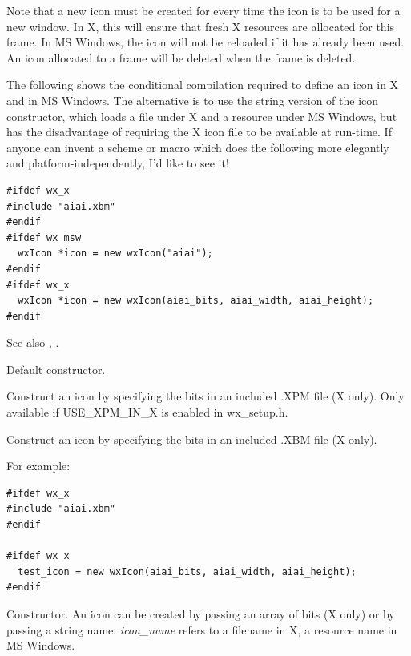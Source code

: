 Note that a new icon must be created for every time the icon is to be
used for a new window. In X, this will ensure that fresh X resources
are allocated for this frame. In MS Windows, the icon will not be
reloaded if it has already been used. An icon allocated to a frame will
be deleted when the frame is deleted.

The following shows the conditional compilation required to define an
icon in X and in MS Windows. The alternative is to use the string
version of the icon constructor, which loads a file under X and a
resource under MS Windows, but has the disadvantage of requiring the
X icon file to be available at run-time. If anyone can invent a
scheme or macro which does the following more elegantly and
platform-independently, I'd like to see it!

\begin{verbatim}
#ifdef wx_x
#include "aiai.xbm"
#endif
#ifdef wx_msw
  wxIcon *icon = new wxIcon("aiai");
#endif
#ifdef wx_x
  wxIcon *icon = new wxIcon(aiai_bits, aiai_width, aiai_height);
#endif
\end{verbatim}

See also , .



Default constructor.


Construct an icon by specifying the bits in an included .XPM file (X only). 
Only available if USE\_XPM\_IN\_X is enabled in wx\_setup.h.


Construct an icon by specifying the bits in an included .XBM file (X only). 

For example:

\begin{verbatim}
#ifdef wx_x
#include "aiai.xbm"
#endif

#ifdef wx_x
  test_icon = new wxIcon(aiai_bits, aiai_width, aiai_height);
#endif
\end{verbatim}


Constructor. An icon can be created by passing an array of bits (X only)
or by passing a string name. {\it icon\_name} refers to a filename in X,
a resource name in MS Windows.  


